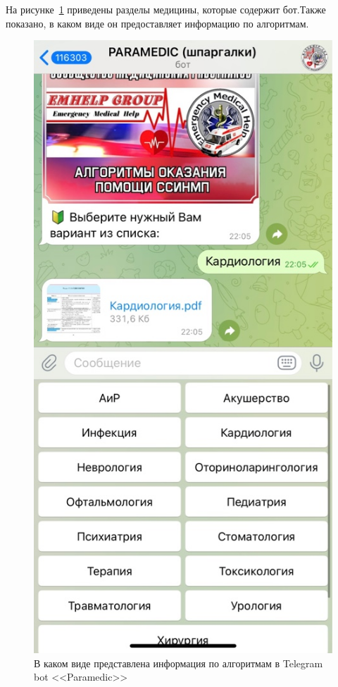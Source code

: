 \begin{enumerate}
    На рисунке~\ref{fig:fig06} приведены разделы медицины, которые содержит бот.Также показано, в каком виде он предоставляет информацию по алгоритмам.

     \begin{figure}
        \includegraphics[scale=0.6]{styles/diploma/inc/prog2_2.jpeg}
        \caption{В каком виде представлена информация по алгоритмам в Telegram bot <<Paramedic>>}
        \label{fig:fig06}
    \end{figure}


\end{enumerate}
